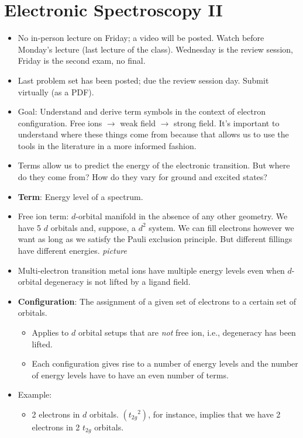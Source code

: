 \documentclass[../notes.tex]{subfiles}
\begin{document}
\section{Electronic Spectroscopy II}
\begin{itemize}
    \item {}No in-person lecture on Friday; a video will be posted. Watch before Monday's lecture (last lecture of the class). Wednesday is the review session, Friday is the second exam, no final.
    \item Last problem set has been posted; due the review session day. Submit virtually (as a PDF).
    \item Goal: Understand and derive term symbols in the context of electron configuration. Free ions $\to$ weak field $\to$ strong field. It's important to understand where these things come from because that allows us to use the tools in the literature in a more informed fashion.
    \item Terms allow us to predict the energy of the electronic transition. But where do they come from? How do they vary for ground and excited states?
    \item \textbf{Term}: Energy level of a spectrum.
    \item Free ion term: $d$-orbital manifold in the absence of any other geometry. We have 5 $d$ orbitals and, suppose, a $d^2$ system. We can fill electrons however we want as long as we satisfy the Pauli exclusion principle. But different fillings have different energies.
    \emph{picture}
    \item Multi-electron transition metal ions have multiple energy levels even when $d$-orbital degeneracy is not lifted by a ligand field.
    \item \textbf{Configuration}: The assignment of a given set of electrons to a certain set of orbitals.
    \begin{itemize}
        \item Applies to $d$ orbital setups that are \emph{not} free ion, i.e., degeneracy has been lifted.
        \item Each configuration gives rise to a number of energy levels and the number of energy levels have to have an even number of terms.
    \end{itemize}
    \item Example:
    \begin{itemize}
        \item 2 electrons in $d$ orbitals. $({t_{2g}}^2)$, for instance, implies that we have 2 electrons in 2 $t_{2g}$ orbitals.

\end{itemize}
\end{itemize}
\end{document}
